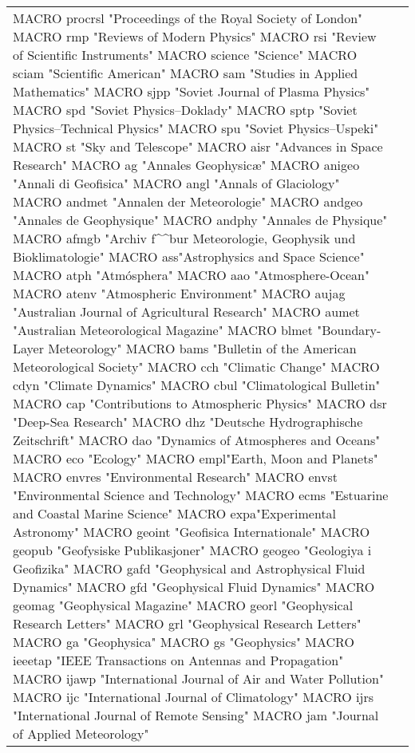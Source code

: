\documentclass{article}
\begin{document}
\begin{longtable}{lp{6cm}}
MACRO {procrsl} {"Proceedings of the Royal Society of London"}
MACRO {rmp} {"Reviews of Modern Physics"}
MACRO {rsi} {"Review of Scientific Instruments"}
MACRO {science} {"Science"}
MACRO {sciam} {"Scientific American"}
MACRO {sam} {"Studies in Applied Mathematics"}
MACRO {sjpp} {"Soviet Journal of Plasma Physics"}
MACRO {spd} {"Soviet Physics--Doklady"}
MACRO {sptp} {"Soviet Physics--Technical Physics"}
MACRO {spu} {"Soviet Physics--Uspeki"}
MACRO {st} {"Sky and Telescope"}
MACRO {aisr} {"Advances in Space Research"}
MACRO {ag} {"Annales Geophysic\ae"}
MACRO {anigeo} {"Annali di Geofisica"}
MACRO {angl} {"Annals of Glaciology"}
MACRO {andmet} {"Annalen der Meteorologie"}
MACRO {andgeo} {"Annales de Geophysique"}
MACRO {andphy} {"Annales de Physique"}
MACRO {afmgb} {"Archiv f\^^b{u}r Meteorologie, Geophysik und Bioklimatologie"}
MACRO {ass}{"Astrophysics and Space Science"}
MACRO {atph} {"Atm\'osphera"}
MACRO {aao} {"Atmosphere-Ocean"}
MACRO {atenv} {"Atmospheric Environment"}
MACRO {aujag} {"Australian Journal of Agricultural Research"}
MACRO {aumet} {"Australian Meteorological Magazine"}
MACRO {blmet} {"Boundary-Layer Meteorology"}
MACRO {bams} {"Bulletin of the American Meteorological Society"}
MACRO {cch} {"Climatic Change"}
MACRO {cdyn} {"Climate Dynamics"}
MACRO {cbul} {"Climatological Bulletin"}
MACRO {cap} {"Contributions to Atmospheric Physics"}
MACRO {dsr} {"Deep-Sea Research"}
MACRO {dhz} {"Deutsche Hydrographische Zeitschrift"}
MACRO {dao} {"Dynamics of Atmospheres and Oceans"}
MACRO {eco} {"Ecology"}
MACRO {empl}{"Earth, Moon and Planets"}
MACRO {envres} {"Environmental Research"}
MACRO {envst} {"Environmental Science and Technology"}
MACRO {ecms} {"Estuarine and Coastal Marine Science"}
MACRO {expa}{"Experimental Astronomy"}
MACRO {geoint} {"Geofisica Internationale"}
MACRO {geopub} {"Geofysiske Publikasjoner"}
MACRO {geogeo} {"Geologiya i Geofizika"}
MACRO {gafd} {"Geophysical and Astrophysical Fluid Dynamics"}
MACRO {gfd} {"Geophysical Fluid Dynamics"}
MACRO {geomag} {"Geophysical Magazine"}
MACRO {georl} {"Geophysical Research Letters"}
MACRO {grl} {"Geophysical Research Letters"}
MACRO {ga} {"Geophysica"}
MACRO {gs} {"Geophysics"}
MACRO {ieeetap} {"IEEE Transactions on Antennas and Propagation"}
MACRO {ijawp} {"International Journal of Air and Water Pollution"}
MACRO {ijc} {"International Journal of Climatology"}
MACRO {ijrs} {"International Journal of Remote Sensing"}
MACRO {jam} {"Journal of Applied Meteorology"}

\end{longtable}
\end{document}
